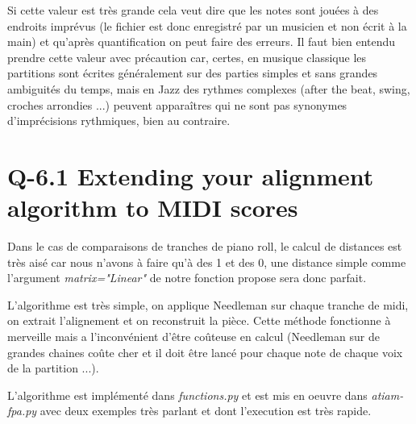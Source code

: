 \documentclass[10.5pt, oneside]{article}   	%
\begin{document}
Si cette valeur est très grande cela veut dire que les notes sont jouées à des endroits imprévus (le fichier est donc enregistré par un musicien et non écrit à la main) et qu'après quantification on peut faire des erreurs. Il faut bien entendu prendre cette valeur avec précaution car, certes, en musique classique les partitions sont écrites généralement sur des parties simples et sans grandes ambiguités du temps, mais en Jazz des rythmes complexes (after the beat, swing, croches arrondies ...) peuvent apparaîtres qui ne sont pas synonymes d'imprécisions rythmiques, bien au contraire.


\section{Q-6.1 Extending your alignment algorithm to MIDI scores}


Dans le cas de comparaisons de tranches de piano roll, le calcul de distances est très aisé car nous n'avons à faire qu'à des 1 et des 0, une distance simple comme l'argument \textit{matrix="Linear"} de notre fonction propose sera donc parfait.

L'algorithme est très simple, on applique Needleman sur chaque tranche de midi, on extrait l'alignement et on reconstruit la pièce. Cette méthode fonctionne à merveille mais a l'inconvénient d'être coûteuse en calcul (Needleman sur de grandes chaines coûte cher et il doit être lancé pour chaque note de chaque voix de la partition ...).

L'algorithme est implémenté dans \textit{functions.py} et est mis en oeuvre dans \textit{atiam-fpa.py} avec deux exemples très parlant et dont l'execution est très rapide.
\end{document}
